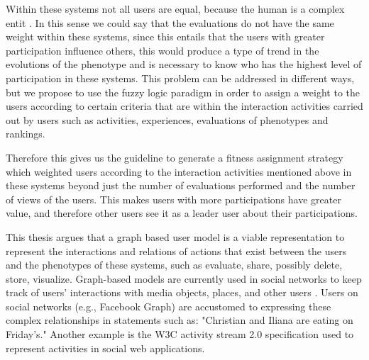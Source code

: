 \par Within these systems not all users are equal, because the human is a complex
entit \cite{}. In this sense we could say that the evaluations do not have the
same weight within these systems, since this entails that the users with greater
participation influence others, this would produce a type of trend in the
evolutions of the phenotype and is necessary to know who has the highest level
of participation in these systems. This problem can be addressed in different
ways, but we propose to use the fuzzy logic paradigm
\cite{Zadeh1973}\cite{TakagiSugeno1983}\cite{ohsaki1998input}in order to assign
a weight to the users according to certain criteria that are within the
interaction activities carried out by users such as activities, experiences,
evaluations of phenotypes and rankings.

\par Therefore this gives us the guideline to generate a fitness assignment
strategy which weighted users according to the interaction activities mentioned
above in these systems beyond just the number of evaluations performed and the
number of views of the users. This makes users with more participations have
greater value, and therefore other users see it as a leader user about their
participations.

\par This thesis argues that a graph based user model is a viable representation to
represent the interactions and relations of actions that exist between the users
and the phenotypes of these systems, such as evaluate, share, possibly delete,
store, visualize. Graph-based models are currently used in social networks to
keep track of users' interactions with media objects, places, and other users
\cite{bondy1976graph, miller2013graph, holzschuher2013performance}. Users on
social networks (e.g., Facebook Graph) are accustomed to expressing these
complex relationships in statements such as: "Christian and Iliana are eating on
Friday's." Another example is the W3C activity stream 2.0 specification used to
represent activities in social web applications.

